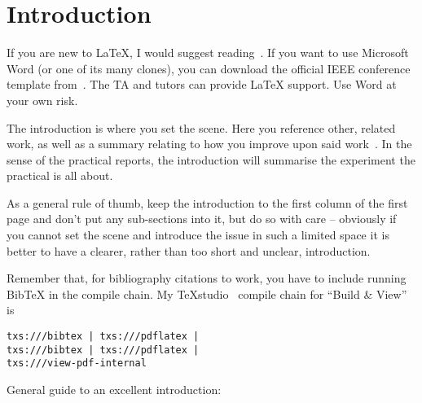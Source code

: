 \section{Introduction}

If you are new to \LaTeX{}, I would suggest reading~\cite{Oetiker_2015}.  If you want to use Microsoft Word (or one of its many clones), you can download the official IEEE conference template from~\cite{Word_Template}.  The TA and tutors can provide \LaTeX{} support.  Use Word at your own risk.

The introduction is where you set the scene.  Here you reference other, related work, as well as a summary relating to how you improve upon said work~\cite{BibExample}.  In the sense of the practical reports, the introduction will summarise the experiment the practical is all about.

As a general rule of thumb, keep the introduction to the first column of the first page and don't put any \mbox{sub-sections} into it, but do so with care -- obviously if you cannot set the scene and introduce the issue in such a limited space it is better to have a clearer, rather than too short and unclear, introduction.

Remember that, for bibliography citations to work, you have to include running Bib\TeX{} in the compile chain.  My TeXstudio~\cite{TeXstudio} compile chain for ``Build \& View'' is\linebreak
\vspace{-6mm}
\begin{verbatim}
txs:///bibtex | txs:///pdflatex |
txs:///bibtex | txs:///pdflatex |
txs:///view-pdf-internal
\end{verbatim}

General guide to an excellent introduction:

